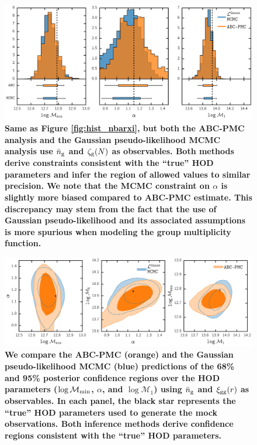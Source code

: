 \documentclass[fleqn,usenatbib]{mnras}
\begin{document}
\begin{figure}
\includegraphics[width=1.\textwidth]{figs/paper_ABCvsMCMC_nbargmf.pdf}
\caption{\label{fig:hist_nbargmf} 
{\bf \color{dred}
Same as Figure \ref{fig:hist_nbarxi}, but both the ABC-PMC
analysis and the Gaussian pseudo-likelihood MCMC analysis use $\bar{n}_{\mathrm{g}}$ and $\mathcal{\zeta}_{\rm g}(N)$ as 
observables. Both methods derive constraints consistent with the ``true'' HOD parameters 
and infer the region of allowed values to similar precision. We note that the MCMC constraint 
on $\alpha$ is slightly more biased compared to ABC-PMC estimate. This discrepancy may stem 
from the fact that the use of Gaussian pseudo-likelihood and its associated assumptions is more 
spurious when modeling the group multiplicity function.}
}
\end{figure}

\begin{figure}
\includegraphics[width=1.\textwidth]{figs/paper_ABCvsMCMC_contour_nbarxi.pdf}
\caption{\label{fig:cont_nbarxi}
{\bf \color{dred}
We compare the ABC-PMC (orange) and the Gaussian pseudo-likelihood MCMC (blue)
predictions of the 68\% and 95\% posterior confidence regions over the HOD 
parameters ($\log \mathcal{M}_{\rm min}$, $\alpha$, and $\log \mathcal{M}_{1}$) 
using $\bar{n}_{\mathrm{g}}$ and $\xi_{\mathrm{gg}}(r)$ as observables. In each panel, the black star
represents the ``true'' HOD parameters used to generate the mock observations. 
Both inference methods derive confidence regions consistent with the ``true'' 
HOD parameters.
}
}
\end{figure}
\end{document}
